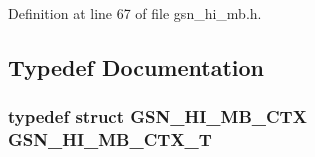 Definition at line 67 of file gsn\_\-hi\_\-mb.h.



\subsection{Typedef Documentation}
\hypertarget{a00506_a99ba5f3828c434894ed3e105eaff5a11}{
\subsubsection[{GSN\_\-HI\_\-MB\_\-CTX\_\-T}]{\setlength{\rightskip}{0pt plus 5cm}typedef struct {\bf GSN\_\-HI\_\-MB\_\-CTX}  {\bf GSN\_\-HI\_\-MB\_\-CTX\_\-T}}}
\label{a00506_a99ba5f3828c434894ed3e105eaff5a11}


